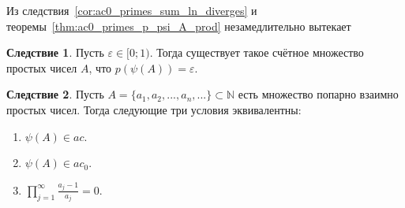 \documentclass[a4paper,openbib]{article}
\theoremstyle{definition}
\newtheorem{corollary}{Следствие}[lemma]
\begin{document}
Из следствия~\ref{cor:ac0_primes_sum_ln_diverges} и теоремы~\ref{thm:ac0_primes_p_psi_A_prod} незамедлительно вытекает
\begin{corollary}
	Пусть $\varepsilon \in {[} 0; 1)$.
	Тогда существует такое счётное множество простых чисел $A$, что $p(\psi(A))=\varepsilon$.
\end{corollary}


\begin{corollary}
	Пусть $A=\{a_1, a_2, ..., a_n, ...\}\subset\mathbb{N}$ есть множество попарно взаимно простых чисел.
	Тогда следующие три условия эквивалентны:
	\begin{enumerate}
		\item
			$\psi(A)\in ac$.
		\item
			$\psi(A)\in ac_0$.
		\item
			$\prod_{j=1}^\infty \frac{a_j -1}{a_j} = 0$.
	\end{enumerate}
\end{corollary}



\printbibliography{}
\end{document}
